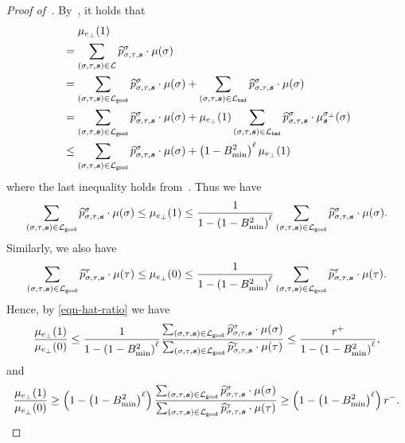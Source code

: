 \documentclass[11pt]{article}
\def\!#1{\mathtt{#1}}
\def\bad{\!{bad}}
\def\good{\!{good}}
\def\symbolwidth{\phantom{{}={}}}
\newcommand{\wh}[1]{\widehat{#1}}
\newcommand{\seqS}{\boldsymbol{s}}
\begin{document}
\begin{proof}[Proof of~]
    By~, it holds that
    \begin{align*}
        &\symbolwidth \mu_{e_\bot}(1) \\
        &= \sum_{(\sigma, \tau, \seqS) \in \+L} \wh{p}_{\sigma, \tau, \seqS}^{\sigma} \cdot \mu(\sigma) \\
        &= \sum_{(\sigma, \tau, \seqS) \in \+L_{\good}} \wh{p}_{\sigma, \tau, \seqS}^{\sigma} \cdot  \mu(\sigma) + \sum_{(\sigma, \tau, \seqS) \in \+L_{\bad}} \wh{p}_{\sigma, \tau, \seqS}^{\sigma} \cdot  \mu(\sigma) \\
        &= \sum_{(\sigma, \tau, \seqS) \in \+L_{\good}} \wh{p}_{\sigma, \tau, \seqS}^{\sigma} \cdot \mu(\sigma) + \mu_{e_\bot}(1) \sum_{(\sigma, \tau, \seqS) \in \+L_{\bad}} \wh{p}_{\sigma, \tau, \seqS}^{\sigma} \cdot \mu_{\seqS}^{\sigma_{\bot}}(\sigma)\\
        &\le \sum_{(\sigma, \tau, \seqS) \in \+L_{\good}} \wh{p}_{\sigma, \tau, \seqS}^{\sigma} \cdot \mu(\sigma) + \left(1 - B_{\min}^2\right)^{\ell} \mu_{e_\bot}(1)
    \end{align*}
    where the last inequality holds from~. Thus we have
    $$
        \sum_{(\sigma, \tau, \seqS) \in \+L_{\good}} \wh{p}_{\sigma, \tau, \seqS}^{\sigma} \cdot \mu(\sigma) \le \mu_{e_\bot}(1) \le \frac{1}{1 - \left(1 - B_{\min}^2\right)^{\ell}} \sum_{(\sigma, \tau, \seqS) \in \+L_{\good}} \wh{p}_{\sigma, \tau, \seqS}^{\sigma} \cdot \mu(\sigma).
    $$
    Similarly, we also have
    $$
        \sum_{(\sigma, \tau, \seqS) \in \+L_{\good}} \wh{p}_{\sigma, \tau, \seqS}^{\tau} \cdot\mu(\tau)\le \mu_{e_\bot}(0) \le \frac{1}{1 - \left(1 - B_{\min}^2\right)^{\ell}} \sum_{(\sigma, \tau, \seqS) \in \+L_{\good}} \wh{p}_{\sigma, \tau, \seqS}^{\tau} \cdot \mu(\tau).
    $$
    Hence, by \eqref{eqn-hat-ratio} we have
    \begin{align*}
        \frac{\mu_{e_\bot}(1)}{\mu_{e_\bot}(0)} \le \frac{1}{1 - \left(1 - B_{\min}^2\right)^{\ell}} \frac{\sum_{(\sigma, \tau, \seqS) \in \+L_{\good}} \wh{p}_{\sigma, \tau, \seqS}^{\sigma} \cdot \mu(\sigma)}{\sum_{(\sigma, \tau, \seqS) \in \+L_{\good}} \wh{p}_{\sigma, \tau, \seqS}^{\tau} \cdot \mu(\tau)} 
        \le \frac{r^+}{1 - \left(1 - B_{\min}^2\right)^{\ell}},
    \end{align*}
    and
    \begin{align*}
       \frac{\mu_{e_\bot}(1)}{\mu_{e_\bot}(0)} \ge \left(1 - \left(1 - B_{\min}^2\right)^{\ell}\right) \frac{\sum_{(\sigma, \tau, \seqS) \in \+L_{\good}} \wh{p}_{\sigma, \tau, \seqS}^{\sigma} \cdot \mu(\sigma)}{\sum_{(\sigma, \tau, \seqS) \in \+L_{\good}} \wh{p}_{\sigma, \tau, \seqS}^{\tau} \cdot \mu(\tau)} 
        \ge \left(1 - \left(1 - B_{\min}^2\right)^{\ell}\right) r^-.
    \end{align*}
\end{proof}
\end{document}
